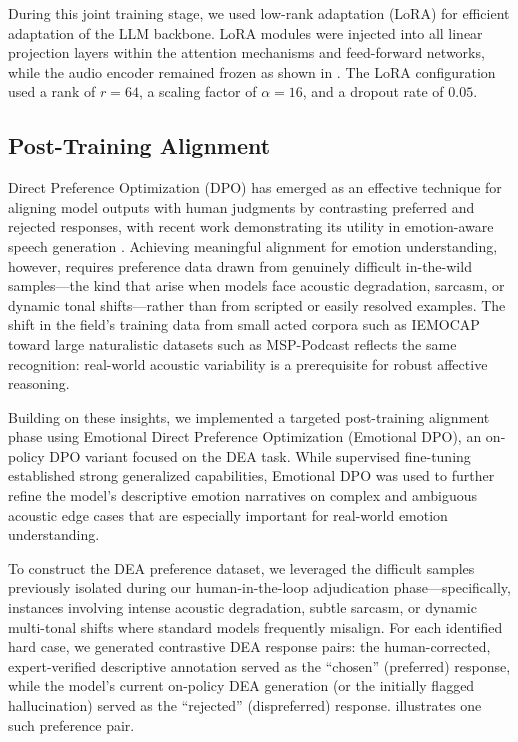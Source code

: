 During this joint training stage, we used low-rank adaptation (LoRA) \cite{LoRA} for efficient adaptation of the LLM backbone. LoRA modules were injected into all linear projection layers within the attention mechanisms and feed-forward networks, while the audio encoder remained frozen as shown in . The LoRA configuration used a rank of $r{=}64$, a scaling factor of $\alpha{=}16$, and a dropout rate of $0.05$.



\subsection{Post-Training Alignment}

Direct Preference Optimization (DPO) \cite{DPO} has emerged as an effective technique for aligning model outputs with human judgments by contrasting preferred and rejected responses, with recent work demonstrating its utility in emotion-aware speech generation \cite{gao2024emodpo}. Achieving meaningful alignment for emotion understanding, however, requires preference data drawn from genuinely difficult in-the-wild samples---the kind that arise when models face acoustic degradation, sarcasm, or dynamic tonal shifts---rather than from scripted or easily resolved examples. The shift in the field's training data from small acted corpora such as IEMOCAP \cite{IEMOCAP} toward large naturalistic datasets such as MSP-Podcast \cite{MSP-Podcast} reflects the same recognition: real-world acoustic variability is a prerequisite for robust affective reasoning.

Building on these insights, we implemented a targeted post-training alignment phase using Emotional Direct Preference Optimization (Emotional DPO), an on-policy DPO variant focused on the DEA task. While supervised fine-tuning established strong generalized capabilities, Emotional DPO was used to further refine the model's descriptive emotion narratives on complex and ambiguous acoustic edge cases that are especially important for real-world emotion understanding.

To construct the DEA preference dataset, we leveraged the difficult samples previously isolated during our human-in-the-loop adjudication phase---specifically, instances involving intense acoustic degradation, subtle sarcasm, or dynamic multi-tonal shifts where standard models frequently misalign. For each identified hard case, we generated contrastive DEA response pairs: the human-corrected, expert-verified descriptive annotation served as the ``chosen'' (preferred) response, while the model's current on-policy DEA generation (or the initially flagged hallucination) served as the ``rejected'' (dispreferred) response.  illustrates one such preference pair.

